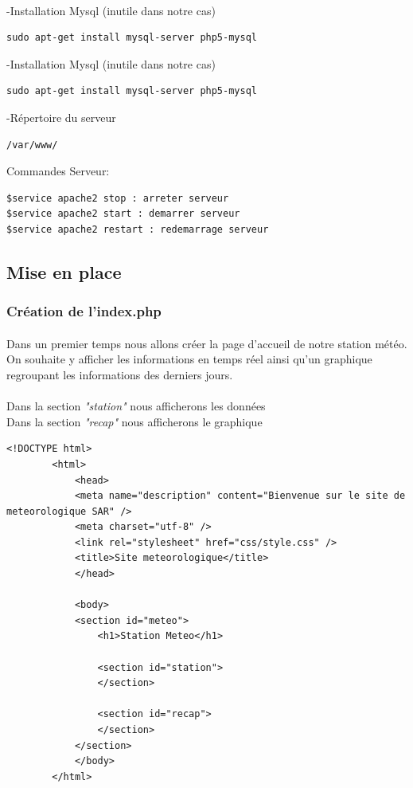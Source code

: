 \documentclass[a4paper, titlepage, oneside, 12pt]{article}%
\begin{document}
\paragraph{}
-Installation Mysql (inutile dans notre cas)
\begin{lstlisting}
sudo apt-get install mysql-server php5-mysql
\end{lstlisting}
-Installation Mysql (inutile dans notre cas)
\begin{lstlisting}
sudo apt-get install mysql-server php5-mysql
\end{lstlisting}
-Répertoire du serveur
\begin{lstlisting}
/var/www/
\end{lstlisting}

Commandes Serveur:
\begin{lstlisting}
$service apache2 stop : arreter serveur
$service apache2 start : demarrer serveur
$service apache2 restart : redemarrage serveur
\end{lstlisting}

\subsection{Mise en place}
\subsubsection{Création de l'index.php}
\paragraph{}
Dans un premier temps nous allons créer la page d’accueil de notre station météo.
On souhaite y afficher les informations en temps réel ainsi qu'un graphique regroupant les informations des derniers jours.\\ \\ 
Dans la section \textit{"station"} nous afficherons les données\\
Dans la section \textit{"recap"} nous afficherons le graphique\\


\begin{lstlisting}
<!DOCTYPE html>
		<html>
			<head>
			<meta name="description" content="Bienvenue sur le site de meteorologique SAR" />
			<meta charset="utf-8" />
			<link rel="stylesheet" href="css/style.css" />
			<title>Site meteorologique</title>
			</head>

			<body>
			<section id="meteo">
				<h1>Station Meteo</h1>
			
				<section id="station">
				</section>
				
				<section id="recap">				
				</section>
			</section>
			</body>
		</html>
\end{lstlisting}
\end{document}
